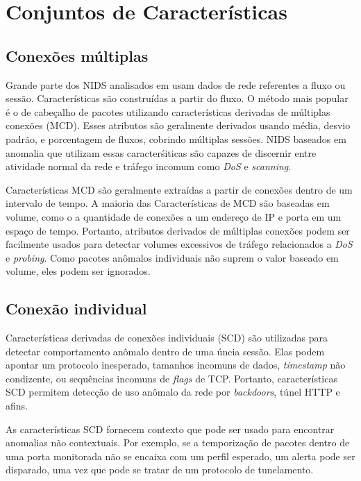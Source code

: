 
\section{Conjuntos de Características}
\subsection{Conexões múltiplas}
Grande parte dos NIDS analisados em \cite{davis11} usam dados de rede referentes a fluxo ou sessão. Características
são construídas a partir do fluxo. O método mais popular é o de cabeçalho de pacotes utilizando características
derivadas de múltiplas conexões (MCD). Esses atributos são geralmente derivados usando média, desvio padrão, e
porcentagem de fluxos, cobrindo múltiplas sessões. NIDS baseados em anomalia que utilizam essas caracterśiticas são
capazes de discernir entre atividade normal da rede e tráfego incomum como \textit{DoS} e \textit{scanning}.
\par Características MCD são geralmente extraídas a partir de conexões dentro de um intervalo de tempo. A maioria das
 Características de MCD são baseadas em volume, como o a quantidade de conexões a um endereço de IP e porta
 em um espaço de tempo. Portanto, atributos derivados de múltiplas conexões podem ser facilmente usados para detectar
 volumes excessivos de tráfego relacionados a \textit{DoS} e \textit{probing}. Como pacotes anômalos individuais não
 suprem o valor baseado em volume, eles podem ser ignorados.

\subsection{Conexão individual}
Características derivadas de conexões individuais (SCD) são utilizadas para detectar comportamento anômalo dentro de
uma úncia sessão. Elas podem apontar um protocolo inesperado, tamanhos incomuns de dados, \emph{timestamp} não condizente,
ou sequências incomuns de \textit{flags} de TCP. Portanto, características SCD permitem detecção de uso anômalo da rede
por \textit{backdoors}, túnel HTTP e afins.
\par As características SCD fornecem contexto que pode ser usado para encontrar anomalias não contextuais. Por exemplo, se a
temporização de pacotes dentro de uma porta monitorada não se encaixa com um perfil esperado, um alerta pode ser
disparado, uma vez que pode se tratar de um protocolo de tunelamento.


